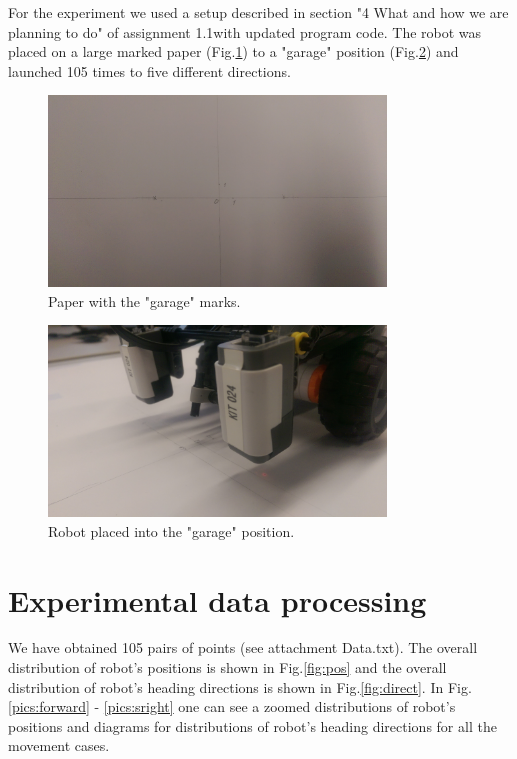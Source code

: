 \documentclass[a4paper, 12pt]{article}
\begin{document}
For the experiment we used a setup described in section "4 What and how we are planning to do" of assignment 1.1with updated program code. The robot was placed on a large marked paper (Fig.\ref{fig:paper}) to a "garage" position (Fig.\ref{fig:garage}) and launched 105 times to five different directions.

\begin{figure}[h]
  \centering
  \caption{Paper with the "garage" marks.\label{fig:paper}}
  \includegraphics[width=0.8\textwidth]{markedPaper}
\end{figure}

\begin{figure}[h]
  \centering
  \caption{Robot placed into the "garage" position.\label{fig:garage}}
  \includegraphics[width=0.8\textwidth]{garage}
\end{figure}


\section{Experimental data processing}

We have obtained 105 pairs of points (see attachment Data.txt). The overall distribution of robot's positions is shown in Fig.\ref{fig:pos} and the overall distribution of robot's heading directions is shown in Fig.\ref{fig:direct}. In Fig. \ref{pics:forward} - \ref{pics:sright} one can see a zoomed distributions of robot's positions and diagrams for distributions of robot's heading directions for all the movement cases. 
\end{document}
